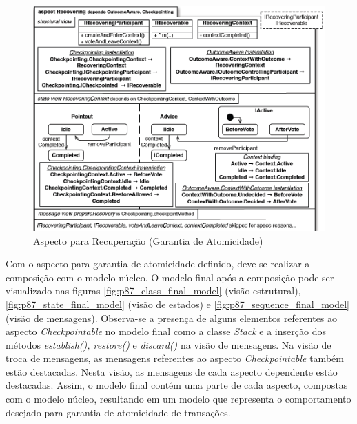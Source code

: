 \begin{landscape}
\begin{figure}
	\centering
	\includegraphics[width=450px]{img/p87_recovering_aspect.png}
	\caption{Aspecto para Recuperação (Garantia de
	Atomicidade)}\label{fig:p87_recovering_aspect.png}
\end{figure}
\end{landscape}

Com o aspecto para garantia de atomicidade definido, deve-se realizar a composição com o modelo núcleo. O modelo final após a composição pode ser
visualizado nas figuras \ref{fig:p87_class_final_model} (visão estrutural), \ref{fig:p87_state_final_model} (visão de estados) e \ref{fig:p87_sequence_final_model} (visão de mensagens). 
Observa-se a presença de alguns elementos referentes ao aspecto \textit{Checkpointable} no modelo final como a classe \textit{Stack} e a inserção dos métodos \textit{establish(),
restore()} e \textit{discard()} na visão de mensagens. Na visão de troca de mensagens, as mensagens referentes ao aspecto \textit{Checkpointable}
também estão destacadas. Nesta visão, as mensagens de cada aspecto dependente estão destacadas. Assim, o modelo final contém uma parte de cada
aspecto, compostas com o modelo núcleo, resultando em um modelo que representa o comportamento desejado para garantia de atomicidade de transações.

